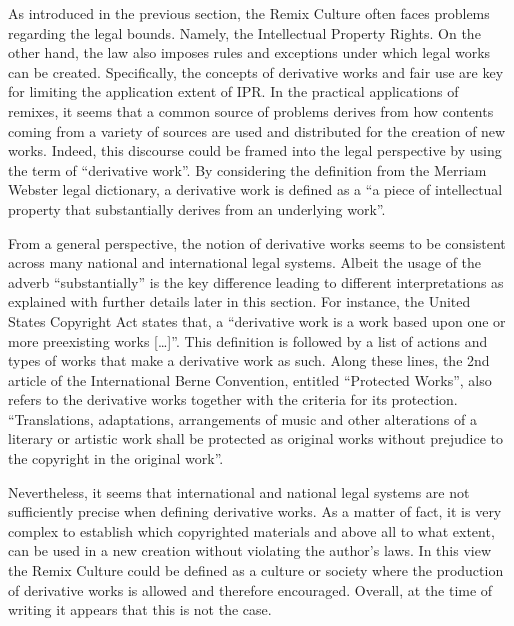 As introduced in the previous section, the Remix Culture often faces problems regarding the legal bounds. Namely, the Intellectual Property Rights. On the other hand, the law also imposes rules and exceptions under which legal works can be created. Specifically, the concepts of derivative works and fair use are key for limiting the application extent of IPR.
In the practical applications of remixes, it seems that a common source of problems derives from how contents coming from a variety of sources are used and distributed for the creation of new works. Indeed, this discourse could be framed into the legal perspective by using the term of “derivative work”. By considering the definition from the Merriam Webster legal dictionary, a derivative work is defined as a “a piece of intellectual property that substantially derives from an underlying work”.

From a general perspective, the notion of derivative works seems to be consistent across many national and international legal systems. Albeit the usage of the adverb “substantially” is the key difference leading to different interpretations as explained with further details later in this section. 
For instance, the United States Copyright Act states that, a “derivative work is a work based upon one or more preexisting works […]”. This definition is followed by a list of actions and types of works that make a derivative work as such.
Along these lines, the 2nd article of the International Berne Convention, entitled “Protected Works”, also refers to the derivative works together with the criteria for its protection. 
“Translations, adaptations, arrangements of music and other alterations of a literary or artistic work shall be protected as original works without prejudice to the copyright in the original work”.

Nevertheless, it seems that international and national legal systems are not sufficiently precise when defining derivative works. As a matter of fact, it is very complex to establish which copyrighted materials and above all to what extent, can be used in a new creation without violating the author’s laws. In this view the Remix Culture could be defined as a culture or society where the production of derivative works is allowed and therefore encouraged. Overall, at the time of writing it appears that this is not the case.

